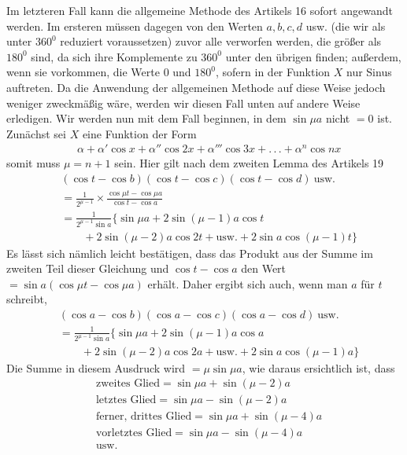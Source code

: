 Im letzteren Fall kann die allgemeine Methode des Artikels 16 sofort angewandt werden. Im ersteren müssen dagegen von den Werten $a,b,c,d$ usw. (die wir als unter $360^{0}$ reduziert voraussetzen) zuvor alle verworfen werden, die größer als $180^{0}$ sind, da sich ihre Komplemente zu $360^{0}$ unter den übrigen finden; außerdem, wenn sie vorkommen, die Werte $0$ und $180^{0}$, sofern in der Funktion $X$ nur Sinus auftreten. Da die Anwendung der allgemeinen Methode auf diese Weise jedoch weniger zweckmäßig wäre, werden wir diesen Fall unten auf andere Weise erledigen. Wir werden nun mit dem Fall beginnen, in dem $\sin\mu a$ nicht $=0$ ist.
Zunächst sei $X$ eine Funktion der Form
\[
\begin{aligned}
&\alpha+\alpha'\cos x+\alpha''\cos2x+\alpha'''\cos3x+.\,.\,.+\alpha^{n}\cos nx
\end{aligned}
\]
somit muss $\mu=n+1$ sein. Hier gilt nach dem zweiten Lemma des Artikels 19
\[
\begin{aligned}
&(\cos t-\cos b)(\cos t-\cos c)(\cos t-\cos d)\ \text{usw.}
\\[5pt]
&=\frac1{2^{\mu-1}}\times\frac{\cos\mu t-\cos\mu a}{\cos t-\cos a}\\[5pt]
&=\frac1{2^{\mu-1}\sin a}\{\sin\mu a+2\sin(\mu-1)a\cos t\\[5pt]
&\qquad{}+2\sin(\mu-2)a\cos2t+\text{usw.}+2\sin a\cos(\mu-1)t\}
\end{aligned}
\]
Es lässt sich nämlich leicht bestätigen, dass das Produkt aus der Summe im zweiten Teil dieser Gleichung und $\cos t-\cos a$ den Wert $=\sin a(\cos\mu t-\cos\mu a)$ erhält. Daher ergibt sich auch, wenn man $a$ für $t$ schreibt,
\[
\begin{aligned}
&(\cos a-\cos b)(\cos a-\cos c)(\cos a-\cos d)\ \text{usw.}
\\[5pt]
&=\frac1{2^{\mu-1}\sin a}\{\sin\mu a+2\sin(\mu-1)a\cos a\\[5pt]
&\qquad+2\sin(\mu-2)a\cos2a+\text{usw.}+2\sin a\cos(\mu-1)a\}
\end{aligned}
\]
Die Summe in diesem Ausdruck wird $=\mu\sin\mu a$, wie daraus ersichtlich ist, dass
\[
\begin{aligned}
&\text{zweites Glied}=\sin\mu a+\sin(\mu-2)a\\[5pt]
&\text{letztes Glied}=\sin\mu a-\sin(\mu-2)a\\[5pt]
&\text{ferner, drittes Glied}=\sin\mu a+\sin(\mu-4)a\\[5pt]
&\text{vorletztes Glied}=\sin\mu a-\sin(\mu-4)a\\[5pt]
&\text{usw.}
\end{aligned}
\]
